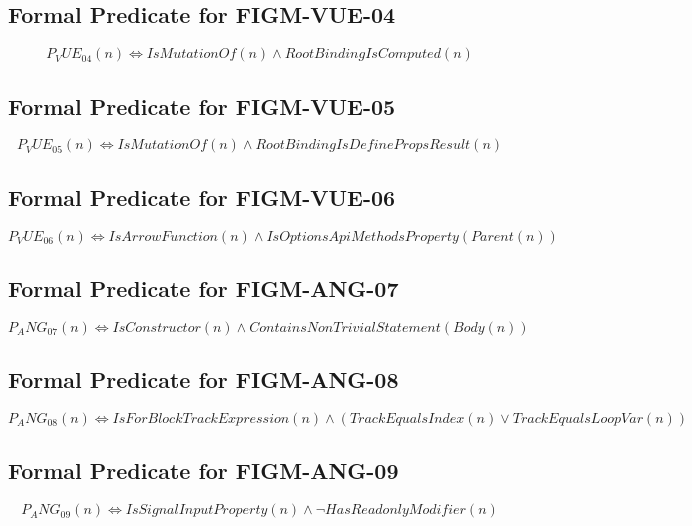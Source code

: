 \subsection{Formal Predicate for FIGM-VUE-04}
\begin{equation}
P_VUE_04(n) \iff IsMutationOf(n) \land RootBindingIsComputed(n)
\end{equation}

\subsection{Formal Predicate for FIGM-VUE-05}
\begin{equation}
P_VUE_05(n) \iff IsMutationOf(n) \land RootBindingIsDefinePropsResult(n)
\end{equation}

\subsection{Formal Predicate for FIGM-VUE-06}
\begin{equation}
P_VUE_06(n) \iff IsArrowFunction(n) \land IsOptionsApiMethodsProperty(Parent(n))
\end{equation}

\subsection{Formal Predicate for FIGM-ANG-07}
\begin{equation}
P_ANG_07(n) \iff IsConstructor(n) \land ContainsNonTrivialStatement(Body(n))
\end{equation}

\subsection{Formal Predicate for FIGM-ANG-08}
\begin{equation}
P_ANG_08(n) \iff IsForBlockTrackExpression(n) \land (TrackEqualsIndex(n) \lor TrackEqualsLoopVar(n))
\end{equation}

\subsection{Formal Predicate for FIGM-ANG-09}
\begin{equation}
P_ANG_09(n) \iff IsSignalInputProperty(n) \land \neg HasReadonlyModifier(n)
\end{equation}

